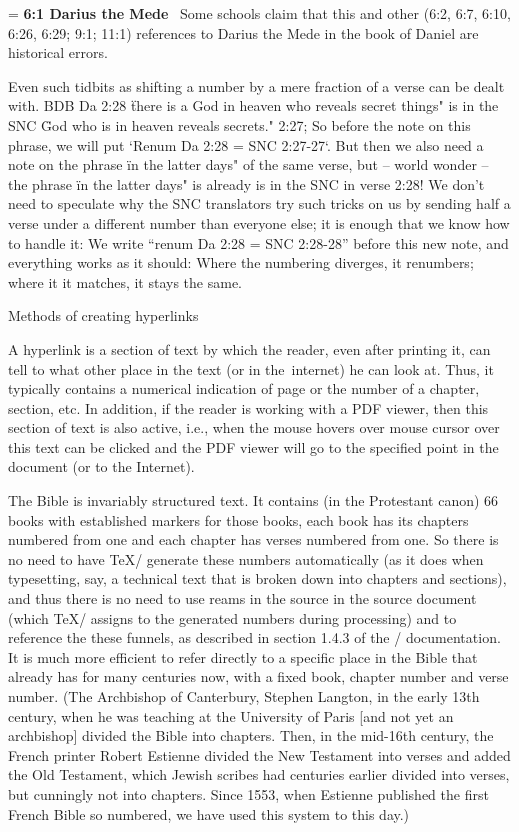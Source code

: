 {{{{{{\medskip\leftskip=\parindent\noindent
{\bf 6:1 Darius the Mede} \ Some schools claim that this and other 
(6:2, 6:7, 6:10, 6:26, 6:29; 9:1; 11:1)     
references to Darius the Mede in the book of Daniel are historical errors.
\medskip}

Even such tidbits as shifting a number by a mere fraction of a verse can be dealt with.
BDB Da 2:28 \"there is a God in heaven who reveals secret things" is in the SNC \"God who is in heaven reveals secrets." 2:27;
So before the note on this phrase, we will put `Renum Da 2:28 = SNC 2:27-27`. 
But then we also need a note on the phrase \"in the latter days" of the same verse, but -- world wonder -- the phrase
\"in the latter days" is already
is in the SNC in verse 2:28! We don't need to speculate why the SNC translators try such tricks on us by sending half a verse under a different number than everyone else;
it is enough that we know how to handle it: 
We write ``renum Da 2:28 = SNC 2:28-28'' before this new note, and everything works as it should: Where the numbering diverges, it renumbers; where it
it matches, it stays the same.


\sec[links] Methods of creating hyperlinks

A hyperlink is a section of text by which the reader, even after printing it, can tell to what other place
in the text (or in the~internet) he can look at. Thus, it typically contains a numerical indication of
page or the number of a chapter, section, etc. In addition, if the reader is working with a PDF
viewer, then this section of text is {also active}, i.e., when the mouse hovers over
mouse cursor over this text can be clicked and the PDF viewer will go to the specified
point in the document (or to the Internet).

The Bible is invariably
structured text. It contains (in the Protestant canon) 66 books with established markers for those books,
each book has its chapters numbered from one and each chapter has verses
numbered from one. So there is no need to have \TeX/ generate these numbers
automatically (as it does when typesetting, say, a technical text that is broken down into
chapters and sections), and thus there is no need to use reams in the source
in the source document (which \TeX/ assigns to the generated numbers during processing) and to reference the
these funnels, as described in section 1.4.3 of the \OpTeX/ documentation. It is
much more efficient to refer directly to a specific place in the Bible that already has
for many centuries now, with a fixed book, chapter number and verse number.
(The Archbishop of Canterbury, Stephen Langton, in the early 13th century, when he was teaching at the University of Paris [and not yet an archbishop]
divided the Bible into chapters. 
Then, in the mid-16th century, the French printer Robert Estienne divided the New Testament into verses and added the Old Testament,
which Jewish scribes had centuries earlier divided into verses, but cunningly not into chapters.
Since 1553, when Estienne published the first French Bible so numbered, we have used this system to this day.)


}}}}}
